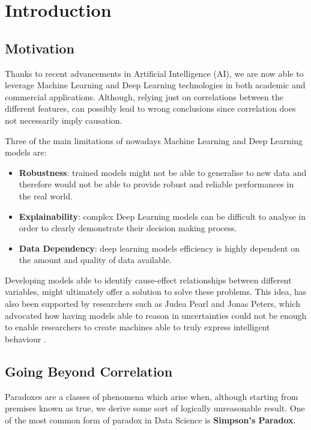 \chapter{Introduction}
\section{Motivation}
\vspace{-0.1cm}
Thanks to recent advancements in Artificial Intelligence (AI), we are now able to leverage Machine Learning and Deep Learning technologies in both academic and commercial applications. Although, relying just on correlations between the different features, can possibly lead to wrong conclusions since correlation does not necessarily imply causation.

Three of the main limitations of nowadays Machine Learning and Deep Learning models are: 
\vspace{-0.2cm}
\begin{itemize}
    \item \textbf{Robustness}: trained models might not be able to generalise to new data and therefore would not be able to provide robust and reliable performances in the real world.
    \item \textbf{Explainability}: complex Deep Learning models can be difficult to analyse in order to clearly demonstrate their decision making process. 
    \item \textbf{Data Dependency}: deep learning models efficiency is highly dependent on the amount and quality of data available. 
\end{itemize}
\vspace{-0.2cm}
Developing models able to identify cause-effect relationships between different variables, might ultimately offer a solution to solve these problems. This idea, has also been supported by researchers such as Judea Pearl and Jonas Peters, which advocated how having models able to reason in uncertainties could not be enough to enable researchers to create machines able to truly express intelligent behaviour \cite{art_perl}.

\section{Going Beyond Correlation}
\label{simp_ref}
Paradoxes are a classes of phenomena which arise when, although starting from premises known as true, we derive some sort of logically unreasonable result. One of the most common form of paradox in Data Science is \textbf{Simpson's Paradox}.

